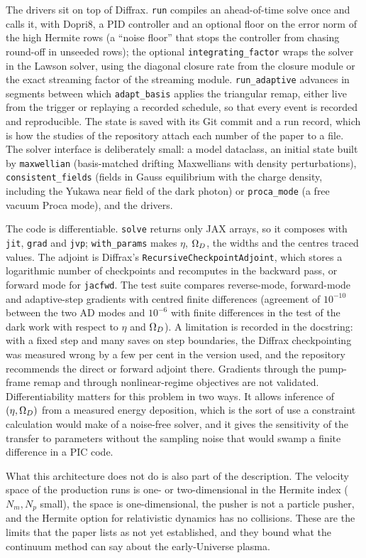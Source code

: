 The drivers sit on top of Diffrax. \texttt{run} compiles an ahead-of-time solve once and calls it, with Dopri8, a PID controller and an optional floor on the error norm of the high Hermite rows (a ``noise floor'' that stops the controller from chasing round-off in unseeded rows); the optional \texttt{integrating\_factor} wraps the solver in the Lawson solver, using the diagonal closure rate from the closure module or the exact streaming factor of the streaming module. \texttt{run\_adaptive} advances in segments between which \texttt{adapt\_basis} applies the triangular remap, either live from the trigger or replaying a recorded schedule, so that every event is recorded and reproducible. The state is saved with its Git commit and a run record, which is how the studies of the repository attach each number of the paper to a file. The solver interface is deliberately small: a model dataclass, an initial state built by \texttt{maxwellian} (basis-matched drifting Maxwellians with density perturbations), \texttt{consistent\_fields} (fields in Gauss equilibrium with the charge density, including the Yukawa near field of the dark photon) or \texttt{proca\_mode} (a free vacuum Proca mode), and the drivers.

The code is differentiable. \texttt{solve} returns only JAX arrays, so it composes with \texttt{jit}, \texttt{grad} and \texttt{jvp}; \texttt{with\_params} makes $\eta$, $\Omega_D$, the widths and the centres traced values. The adjoint is Diffrax's \texttt{RecursiveCheckpointAdjoint}, which stores a logarithmic number of checkpoints and recomputes in the backward pass, or forward mode for \texttt{jacfwd}. The test suite compares reverse-mode, forward-mode and adaptive-step gradients with centred finite differences (agreement of $10^{-10}$ between the two AD modes and $10^{-6}$ with finite differences in the test of the dark work with respect to $\eta$ and $\Omega_D$). A limitation is recorded in the docstring: with a fixed step and many saves on step boundaries, the Diffrax checkpointing was measured wrong by a few per cent in the version used, and the repository recommends the direct or forward adjoint there. Gradients through the pump-frame remap and through nonlinear-regime objectives are not validated. Differentiability matters for this problem in two ways. It allows inference of $(\eta,\Omega_D)$ from a measured energy deposition, which is the sort of use a constraint calculation would make of a noise-free solver, and it gives the sensitivity of the transfer to parameters without the sampling noise that would swamp a finite difference in a PIC code.

What this architecture does not do is also part of the description. The velocity space of the production runs is one- or two-dimensional in the Hermite index ($N_m,N_p$ small), the space is one-dimensional, the pusher is not a particle pusher, and the Hermite option for relativistic dynamics has no collisions. These are the limits that the paper lists as not yet established, and they bound what the continuum method can say about the early-Universe plasma.
